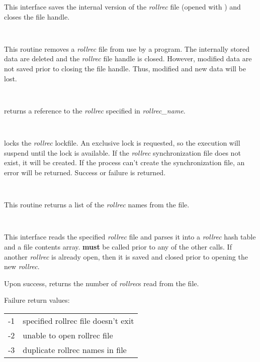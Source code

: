 \begin{description}
This interface saves the internal version of the {\it rollrec} file (opened
with ) and closes the file handle.

\item {}\verb" "

This routine removes a {\it rollrec} file from use by a program.  The internally
stored data are deleted and the {\it rollrec} file handle is closed.  However,
modified data are not saved prior to closing the file handle.  Thus, modified
and new data will be lost.

\item {}\verb" "

 returns a reference to the {\it rollrec} specified in
{\it rollrec\_name}.

\item {}\verb" "

 locks the {\it rollrec} lockfile.  An exclusive lock is
requested, so the execution will suspend until the lock is available.  If the
{\it rollrec} synchronization file does not exist, it will be created.  If the
process can't create the synchronization file, an error will be returned.
Success or failure is returned.

\item {}\verb" "

This routine returns a list of the {\it rollrec} names from the file.

\item {}\verb" "

This interface reads the specified {\it rollrec} file and parses it into a
{\it rollrec} hash table and a file contents array.  
{\bf must} be called prior to any of the other
 calls.  If another {\it rollrec} is
already open, then it is saved and closed prior to opening the new
{\it rollrec}.

Upon success,  returns the number of {\it rollrec}s read
from the file.

Failure return values:

\begin{table}[ht]
\begin{center}
\begin{tabular}{cl}
-1 & specified rollrec file doesn't exit	\\
-2 & unable to open rollrec file		\\
-3 & duplicate rollrec names in file		\\
\end{tabular} 
\end{center}
\end{table}


\end{description}
